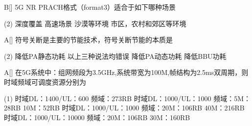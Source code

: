 

\begin{choice}{B}[]
    5G NR PRACH格式（format3）适合于如下哪种场景
    \begin{tasks}(2)
        \task 深度覆盖
        \task 高速场景
        \task 沙漠等环境
        \task 市区，农村和郊区等环境
    \end{tasks}
\end{choice}

\begin{choice}{A}[]
    符号关断是主要的节能技术，符号关断节能的本质是
    \begin{tasks}(2)
        \task 降低PA静态功耗
        \task 以上三种说法均错误
        \task 降低PA动态功耗
        \task 降低BBU功耗
    \end{tasks}
\end{choice}




\begin{choice}{A}[]
    在5G系统中：组网频段为3.5GHz,系统带宽为100M,帧结构为2.5ms双周期，则时域频域可调度资源分别为
    \begin{tasks}(1)
        \task 时域DL：1400/UL：600 频域：273RB
        \task 时域DL：1000/UL：1000 频域：5M：28RB 10M：52RB
        \task 时域DL：1000/UL：1000 频域：20M：106RB 40M：216RB
        \task 时域DL：1000/UL：10000 频域：20M：106RB 30M：160RB
    \end{tasks}
\end{choice}



